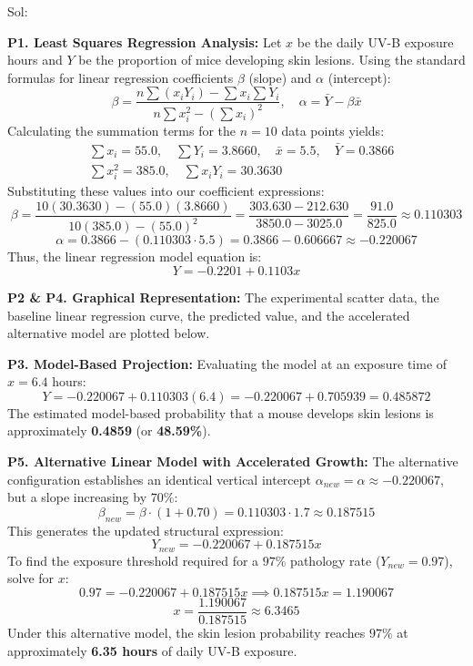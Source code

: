 \documentclass[11pt,svgnames,spanish,oneside]{amsart}
\newenvironment{mysolution}{%
  \solution\color{blue}Sol:
}{%
  \endsolution
}
\begin{document}
\begin{mysolution}
    \textbf{P1. Least Squares Regression Analysis:}
    Let $x$ be the daily UV-B exposure hours and $Y$ be the proportion of mice developing skin lesions. Using the standard formulas for linear regression coefficients $\beta$ (slope) and $\alpha$ (intercept):
    \[
    \beta = \frac{n\sum (x_i Y_i) - \sum x_i \sum Y_i}{n\sum x_i^2 - (\sum x_i)^2}, \quad \alpha = \bar{Y} - \beta \bar{x}
    \]
    Calculating the summation terms for the $n = 10$ data points yields:
    \begin{align*}
    &\sum x_i = 55.0, \quad \sum Y_i = 3.8660, \quad \bar{x} = 5.5, \quad \bar{Y} = 0.3866 \\
    &\sum x_i^2 = 385.0, \quad \sum x_i Y_i = 30.3630
    \end{align*}
    Substituting these values into our coefficient expressions:
    \[
    \beta = \frac{10(30.3630) - (55.0)(3.8660)}{10(385.0) - (55.0)^2} = \frac{303.630 - 212.630}{3850.0 - 3025.0} = \frac{91.0}{825.0} \approx 0.110303
    \]
    \[
    \alpha = 0.3866 - (0.110303 \cdot 5.5) = 0.3866 - 0.606667 \approx -0.220067
    \]
    Thus, the linear regression model equation is:
    \[
    Y = -0.2201 + 0.1103x
    \]

    \textbf{P2 \& P4. Graphical Representation:}
    The experimental scatter data, the baseline linear regression curve, the predicted value, and the accelerated alternative model are plotted below.

    \textbf{P3. Model-Based Projection:}
    Evaluating the model at an exposure time of $x = 6.4$ hours:
    \[
    Y = -0.220067 + 0.110303(6.4) = -0.220067 + 0.705939 = 0.485872
    \]
    The estimated model-based probability that a mouse develops skin lesions is approximately \textbf{0.4859} (or \textbf{48.59\%}).

    \textbf{P5. Alternative Linear Model with Accelerated Growth:}
    The alternative configuration establishes an identical vertical intercept $\alpha_{new} = \alpha \approx -0.220067$, but a slope increasing by $70\%$:
    \[
    \beta_{new} = \beta \cdot (1 + 0.70) = 0.110303 \cdot 1.7 \approx 0.187515
    \]
    This generates the updated structural expression:
    \[
    Y_{new} = -0.220067 + 0.187515x
    \]
    To find the exposure threshold required for a $97\%$ pathology rate ($Y_{new} = 0.97$), solve for $x$:
    \[
    0.97 = -0.220067 + 0.187515x \implies 0.187515x = 1.190067
    \]
    \[
    x = \frac{1.190067}{0.187515} \approx 6.3465
    \]
    Under this alternative model, the skin lesion probability reaches $97\%$ at approximately \textbf{6.35 hours} of daily UV-B exposure.


\end{mysolution}
\end{document}
